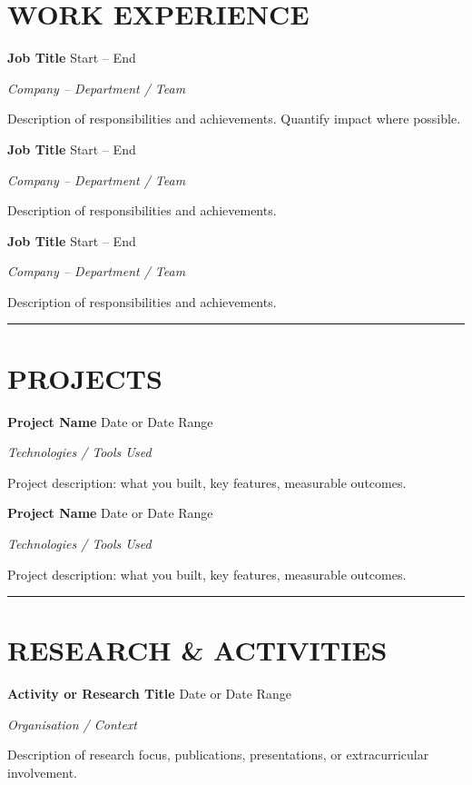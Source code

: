 \documentclass[11pt,a4paper]{article}
\newcommand{\sectrule}{\vspace{2pt}\hrule\vspace{3pt}}
\newcommand{\cventry}[2]{%
  {\color{heading}\textbf{#1}} \hfill {\color{lighttext}#2}\par%
}
\newcommand{\cvsubtitle}[1]{%
  {\color{body}\textit{#1}}\par%
}
\newcommand{\cvbody}[1]{%
  {\color{body}#1}\par%
}
\begin{document}
\section*{WORK EXPERIENCE}

\cventry{Job Title}{Start -- End}
\cvsubtitle{Company -- Department / Team}
\cvbody{%
Description of responsibilities and achievements. Quantify impact where possible.
}

\vspace{3pt}

\cventry{Job Title}{Start -- End}
\cvsubtitle{Company -- Department / Team}
\cvbody{%
Description of responsibilities and achievements.
}

\vspace{3pt}

\cventry{Job Title}{Start -- End}
\cvsubtitle{Company -- Department / Team}
\cvbody{%
Description of responsibilities and achievements.
}

\vspace{2pt}
\sectrule

\section*{PROJECTS}

\cventry{Project Name}{Date or Date Range}
\cvsubtitle{Technologies / Tools Used}
\cvbody{%
Project description: what you built, key features, measurable outcomes.
}

\vspace{3pt}

\cventry{Project Name}{Date or Date Range}
\cvsubtitle{Technologies / Tools Used}
\cvbody{%
Project description: what you built, key features, measurable outcomes.
}

\vspace{2pt}
\sectrule

\section*{RESEARCH \& ACTIVITIES}

\cventry{Activity or Research Title}{Date or Date Range}
\cvsubtitle{Organisation / Context}
\cvbody{%
Description of research focus, publications, presentations, or extracurricular involvement.
}
\end{document}
